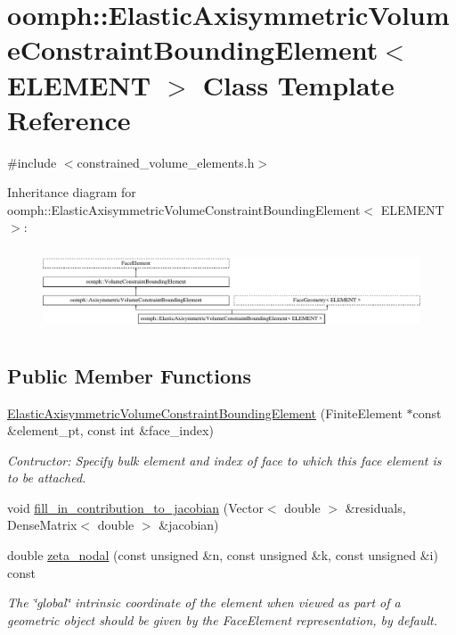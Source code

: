 \hypertarget{classoomph_1_1ElasticAxisymmetricVolumeConstraintBoundingElement}{}\section{oomph\+:\+:Elastic\+Axisymmetric\+Volume\+Constraint\+Bounding\+Element$<$ E\+L\+E\+M\+E\+NT $>$ Class Template Reference}
\label{classoomph_1_1ElasticAxisymmetricVolumeConstraintBoundingElement}


{\ttfamily \#include $<$constrained\+\_\+volume\+\_\+elements.\+h$>$}

Inheritance diagram for oomph\+:\+:Elastic\+Axisymmetric\+Volume\+Constraint\+Bounding\+Element$<$ E\+L\+E\+M\+E\+NT $>$\+:\begin{figure}[H]
\begin{center}
\leavevmode
\includegraphics[height=2.477876cm]{classoomph_1_1ElasticAxisymmetricVolumeConstraintBoundingElement}
\end{center}
\end{figure}
\subsection*{Public Member Functions}
\begin{DoxyCompactItemize}
\item 
\hyperlink{classoomph_1_1ElasticAxisymmetricVolumeConstraintBoundingElement_a533376e1f314fabc4c014f9c7547f5e8}{Elastic\+Axisymmetric\+Volume\+Constraint\+Bounding\+Element} (Finite\+Element $\ast$const \&element\+\_\+pt, const int \&face\+\_\+index)
\begin{DoxyCompactList}\small\item\em Contructor\+: Specify bulk element and index of face to which this face element is to be attached. \end{DoxyCompactList}\item 
void \hyperlink{classoomph_1_1ElasticAxisymmetricVolumeConstraintBoundingElement_adc7f5296f867251fe4b97b01f40c11e7}{fill\+\_\+in\+\_\+contribution\+\_\+to\+\_\+jacobian} (Vector$<$ double $>$ \&residuals, Dense\+Matrix$<$ double $>$ \&jacobian)
\item 
double \hyperlink{classoomph_1_1ElasticAxisymmetricVolumeConstraintBoundingElement_a8fe8843e542a626dd374cc4cd6850bcb}{zeta\+\_\+nodal} (const unsigned \&n, const unsigned \&k, const unsigned \&i) const
\begin{DoxyCompactList}\small\item\em The \char`\"{}global\char`\"{} intrinsic coordinate of the element when viewed as part of a geometric object should be given by the Face\+Element representation, by default. \end{DoxyCompactList}\end{DoxyCompactItemize}
